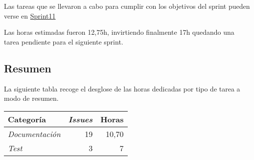 Las tareas que se llevaron a cabo para cumplir con los objetivos del sprint pueden verse en \href{https://github.com/DanielSantidrian/UBUassistant/milestone/14?closed=1}{Sprint11}

Las horas estimadas fueron 12,75h, invirtiendo finalmente 17h quedando una tarea pendiente para el siguiente sprint.


\subsection{Resumen}\label{resumen}

La siguiente tabla recoge el desglose de las horas dedicadas por tipo de tarea a modo de resumen.

\begin{longtable}[]{@{}lrr@{}}
\toprule
\begin{minipage}[b]{0.37\columnwidth}\raggedright\strut
Categoría\strut
\end{minipage} & \begin{minipage}[b]{0.19\columnwidth}\raggedright\strut
\emph{Issues}\strut
\end{minipage} & \begin{minipage}[b]{0.19\columnwidth}\raggedright\strut
Horas\strut
\end{minipage}\tabularnewline
\midrule
\endhead

\begin{minipage}[t]{0.37\columnwidth}\raggedright\strut
\emph{Documentación}\strut
\end{minipage} & \begin{minipage}[t]{0.19\columnwidth}\raggedright\strut
19\strut
\end{minipage} & \begin{minipage}[t]{0.19\columnwidth}\raggedright\strut
10,70\strut
\end{minipage}\tabularnewline


\begin{minipage}[t]{0.37\columnwidth}\raggedright\strut
\emph{Test}\strut
\end{minipage} & \begin{minipage}[t]{0.19\columnwidth}\raggedright\strut
3\strut
\end{minipage} & \begin{minipage}[t]{0.19\columnwidth}\raggedright\strut
7\strut
\end{minipage}\tabularnewline



\end{longtable}
